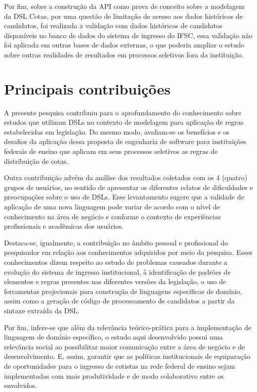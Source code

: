 Por fim, sobre a construção da API como prova de conceito sobre a modelagem da DSL Cotas, por uma questão de limitação de acesso aos dados históricos de candidatos, foi realizada a validação com dados históricos de candidatos disponíveis no banco de dados do sistema de ingresso do \gls{IFSC}, essa validação não foi aplicada em outras bases de dados externas, o que poderia ampliar o estudo sobre outras realidades de resultados em processos seletivos fora da instituição.

\section{Principais contribuições}
\label{principaiscontribuicoes}

A presente pesquisa contribuiu para o aprofundamento do conhecimento sobre estudos que utilizam \gls{DSL}s no contexto de modelagem para aplicação de regras estabelecidas em legislação. Do mesmo modo, avaliam-se os benefícios e os desafios da aplicação dessa proposta de engenharia de software para instituições federais de ensino que aplicam em seus processos seletivos as regras de distribuição de cotas. 

Outra contribuição advém da análise dos resultados coletados com os 4 (quatro) grupos de usuários, no sentido de apresentar os diferentes relatos de dificuldades e preocupações sobre o uso de DSLs. Esse levantamento sugere que a validade de aplicação de uma nova linguagem pode variar de acordo com o nível de conhecimento na área de negócio e conforme o contexto de experiências profissionais e acadêmicas dos usuários.

Destaca-se, igualmente, a contribuição no âmbito pessoal e profissional do pesquisador em relação aos conhecimentos adquiridos por meio da pesquisa. Esses conhecimentos dizem respeito ao estudo de problemas causados durante a evolução do sistema de ingresso institucional, à identificação de padrões de elementos e regras presentes nas diferentes versões da legislação, o uso de ferramentas projecionais para construção de linguagens específicas de domínio, assim como a geração de código de processamento de candidatos a partir da sintaxe extraída da DSL.

Por fim, infere-se que além da relevância teórico-prática para a implementação de linguagem de domínio específico, o estudo aqui desenvolvido possui uma relevância social ao possibilitar maior comunicação entre a área de negócio e de desenvolvimento. E, assim, garantir que as políticas institucionais de equiparação de oportunidades para o ingresso de cotistas na rede federal de ensino sejam implementadas com mais produtividade e de modo colaborativo entre os envolvidos.   

